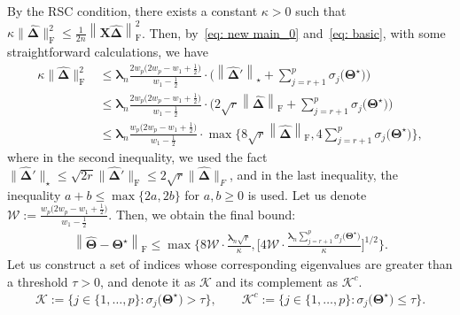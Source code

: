 \documentclass[alpha-refs]{wiley-article}
\begin{document}
By the RSC condition, there exists a constant $\kappa>0$ such that $\kappa \|\boldsymbol{\widehat{\Delta}}\|_{\text{F}}^{2}\leq \frac{1}{2n} \left\| \boldsymbol{X} \boldsymbol{\widehat{\Delta}} \right\|_{\text{F}}^{2}$.
Then, by~\eqref{eq: new main_0} and~\eqref{eq: basic}, with some straightforward calculations, we have
\begin{align}
    \kappa \|\boldsymbol{\widehat{\Delta}}\|_{\text{F}}^{2}
    &\leq
    \boldsymbol{\lambda}_{n}\frac{2w_{p}\big(2w_{p}-w_{1}+\frac{1}{2}\big)}{w_{1}-\frac{1}{2}}
    \cdot \bigg( \left\| \boldsymbol{\widehat{\Delta}}' \right\|_{\star} + \sum_{j=r+1}^{p}\sigma_{j}\big(\boldsymbol{\Theta^{\star}}\big) \bigg) \nonumber \\
    &\leq
    \boldsymbol{\lambda}_{n}\frac{2w_{p}\big(2w_{p}-w_{1}+\frac{1}{2}\big)}{w_{1}-\frac{1}{2}}
    \cdot \bigg( 2\sqrt{r} \left\| \boldsymbol{\widehat{\Delta}} \right\|_{\text{F}} + \sum_{j=r+1}^{p}\sigma_{j}\big(\boldsymbol{\Theta^{\star}}\big) \bigg) \nonumber \\
    &\leq
    \boldsymbol{\lambda}_{n} \frac{w_{p}\big(2w_{p}-w_{1}+\frac{1}{2}\big)}{w_{1}-\frac{1}{2}}
    \cdot \max \bigg\{ 8 \sqrt{r} \left\| \boldsymbol{\widehat{\Delta}} \right\|_{\text{F}}, 4\sum_{j=r+1}^{p}\sigma_{j}\big(\boldsymbol{\Theta^{\star}}\big)
    \bigg\} \nonumber,
\end{align}
where in the second inequality, we used the fact
$\|\boldsymbol{\widehat{\Delta}}'\|_{\star}\leq\sqrt{2r}\|\boldsymbol{\widehat{\Delta}}'\|_{\text{F}} \leq 2\sqrt{r}\|\boldsymbol{\widehat{\Delta}}\|_{F}$, and in the last inequality,
the inequality $a+b\leq \max\{2a, 2b\}$ for $a,b\geq 0$ is used.
Let us denote $\mathcal{W}:=\frac{w_{p}\big(2w_{p}-w_{1}+\frac{1}{2}\big)}{w_{1}-\frac{1}{2}}$.
Then, we obtain the final bound:
\begin{align} \label{Est_bound}
    \left\| \widehat{\boldsymbol{\Theta}} - \boldsymbol{\Theta^{\star}} \right\|_{\text{F}}
    \leq \max\bigg\{ 8\mathcal{W} \cdot \frac{\boldsymbol{\lambda}_{n}\sqrt{r}}{\kappa},
    \bigg[  4 \mathcal{W} \cdot \frac{\boldsymbol{\lambda}_{n}\sum_{j=r+1}^{p}\sigma_{j}\big(\boldsymbol{\Theta^{\star}}\big)}{\kappa}  \bigg]^{1/2}
    \bigg\}.
\end{align}
Let us construct a set of indices whose corresponding eigenvalues are greater than a threshold $\tau>0$, and denote it as $\mathcal{K}$ and its complement as $\mathcal{K}^{c}$.
\begin{align*}
    \mathcal{K}:=\bigg\{ j \in \{1,\dots,p\} : \sigma_{j}\big(\boldsymbol{\Theta}^{\star} \big) > \tau \bigg\}, \qquad
    \mathcal{K}^{c}:=\bigg\{ j \in \{1,\dots,p\} : \sigma_{j}\big(\boldsymbol{\Theta}^{\star} \big) \leq \tau \bigg\}.
\end{align*}
\end{document}
